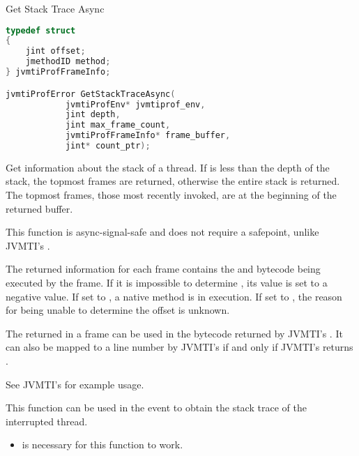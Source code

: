 \begin{apidef}{Get Stack Trace Async}
\begin{lstlisting}[language=C]
typedef struct
{
    jint offset;
    jmethodID method;
} jvmtiProfFrameInfo;

jvmtiProfError GetStackTraceAsync(
            jvmtiProfEnv* jvmtiprof_env,
            jint depth,
            jint max_frame_count,
            jvmtiProfFrameInfo* frame_buffer,
            jint* count_ptr);
\end{lstlisting}

\begin{apidesc}
Get information about the stack of a thread. If  is less than the depth of the stack, the  topmost frames are returned, otherwise the entire stack is returned. The topmost frames, those most recently invoked, are at the beginning of the returned buffer.

\medskip
This function is async-signal-safe and does not require a safepoint, unlike JVMTI's .

\medskip
The returned information for each frame contains the  and bytecode  being executed by the frame. If it is impossible to determine , its value is set to a negative value. If set to , a native method is in execution. If set to , the reason for being unable to determine the offset is unknown.

\medskip
The  returned in a frame can be used in the bytecode returned by JVMTI's . It can also be mapped to a line number by JVMTI's  if and only if JVMTI's  returns .

\medskip
See JVMTI's  for example usage.

\medskip
This function can be used in the  event to obtain the stack trace of the interrupted thread.
\end{apidesc}

\begin{apiphase}
\apiphaselive
\end{apiphase}

\begin{apicap}
\begin{itemize}
\item {} is necessary for this function to work.
\end{itemize}
\end{apicap}


\end{apidef}
